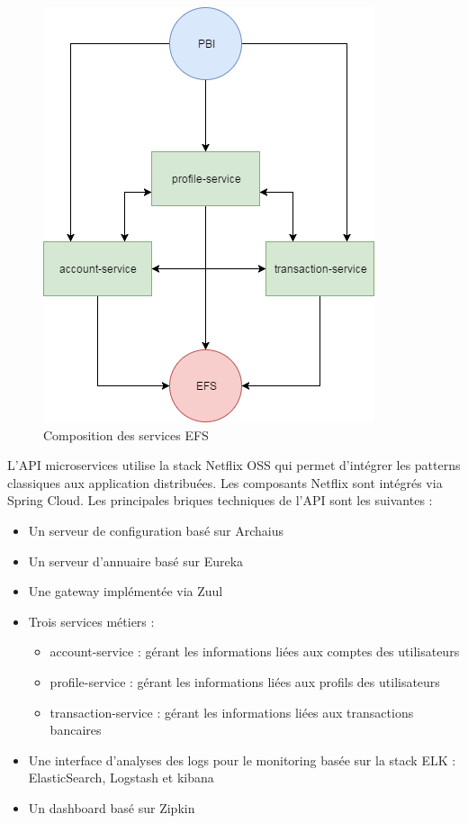 \begin{figure}[H]
\raggedleft
	\includegraphics[scale=0.5]{images/travailNeuflizeOBC/architecture/pbiEfs.png}
	\centering
	\caption{Composition des services EFS}
	\label{coucheMicroservices}
\end{figure}

L'API microservices utilise la stack Netflix OSS qui permet d'intégrer les patterns classiques aux application distribuées. Les composants Netflix sont intégrés via Spring Cloud. Les principales briques techniques de l'API sont les suivantes :\\

\begin{itemize}
	\item Un serveur de configuration basé sur Archaius
	\item Un serveur d'annuaire basé sur Eureka
	\item Une gateway implémentée via Zuul
	\item Trois services métiers :
		\begin{itemize}
			\item account-service : gérant les informations liées aux comptes des utilisateurs
			\item profile-service : gérant les informations liées aux profils des utilisateurs
			\item transaction-service : gérant les informations liées aux transactions bancaires
		\end{itemize}
	\item Une interface d'analyses des logs pour le monitoring basée sur la stack ELK : ElasticSearch, Logstash et kibana
	\item Un dashboard basé sur Zipkin
\end{itemize}